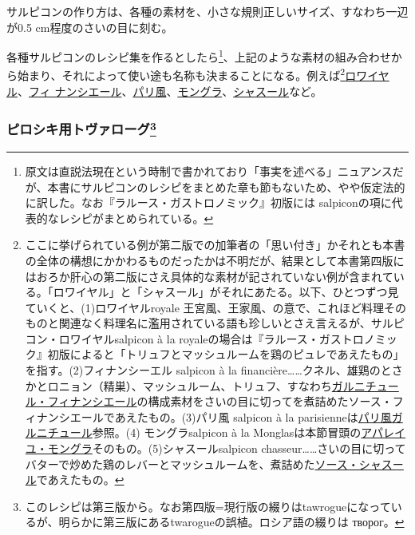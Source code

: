 \begin{recette}
サルピコンの作り方は、各種の素材を、小さな規則正しいサイズ、すなわち一辺が0.5
cm程度のさいの目に刻む。

各種サルピコンのレシピ集を作るとしたら\footnote{原文は直説法現在という時制で書かれており「事実を述べる」ニュアンスだが、本書にサルピコンのレシピをまとめた章も節もないため、やや仮定法的に訳した。なお『ラルース・ガストロノミック』初版には
  salpiconの項に代表的なレシピがまとめられている。}、上記のような素材の組み合わせから始まり、それによって使い途も名称も決まることになる。例えば\footnote{ここに挙げられている例が第二版での加筆者の「思い付き」かそれとも本書の全体の構想にかかわるものだったかは不明だが、結果として本書第四版にはおろか肝心の第二版にさえ具体的な素材が記されていない例が含まれている。「ロワイヤル」と「シャスール」がそれにあたる。以下、ひとつずつ見ていくと、(1)ロワイヤルroyale
  王宮風、王家風、の意で、これほど料理そのものと関連なく料理名に濫用されている語も珍しいとさえ言えるが、サルピコン・ロワイヤルsalpicon
  à la
  royaleの場合は『ラルース・ガストロノミック』初版によると「トリュフとマッシュルームを鶏のピュレであえたもの」を指す。(2)フィナンシーエル
  salpicon à la
  financière\ldots{}\ldots{}クネル、雄鶏のとさかとロニョン（精巣）、マッシュルーム、トリュフ、すなわち\protect\hyperlink{garniture-financiere}{ガルニチュール・フィナンシエール}の構成素材をさいの目に切ってを煮詰めたソース・フィナンシエールであえたもの。(3)パリ風
  salpicon à la
  parisienneは\protect\hyperlink{garniture-parisienne}{パリ風ガルニチュール}参照。(4)
  モングラsalpicon à la
  Monglasは本節冒頭の\protect\hyperlink{appareil-montglas}{アパレイユ・モングラ}そのもの。(5)シャスールsalpicon
  chasseur\ldots{}\ldots{}さいの目に切ってバターで炒めた鶏のレバーとマッシュルームを、煮詰めた\protect\hyperlink{sauce-chasseur}{ソース・シャスール}であえたもの。}\ul{ロワイヤル}、\ul{フィ
ナンシエール}、\ul{パリ風}、\ul{モングラ}、\ul{シャスール}など。

\hypertarget{ux30d4ux30edux30b7ux30adux7528ux30c8ux30f4ux30a1ux30edux30fcux30b072}{%
\subsubsection[ピロシキ用トヴァローグ]{\texorpdfstring{ピロシキ用トヴァローグ\footnote{このレシピは第三版から。なお第四版=現行版の綴りはtawrogueになっているが、明らかに第三版にあるtwarogueの誤植。ロシア語の綴りは
  творог。}}{ピロシキ用トヴァローグ}}\label{ux30d4ux30edux30b7ux30adux7528ux30c8ux30f4ux30a1ux30edux30fcux30b072}}


\end{recette}
